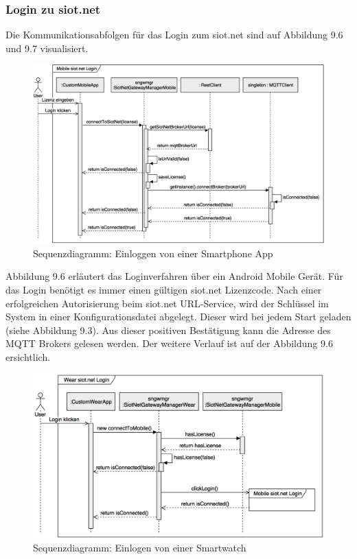 \subsubsection{Login zu siot.net}
Die Kommunikationsabfolgen für das Login zum siot.net sind auf Abbildung 9.6 und 9.7 visualisiert.
\begin{figure}[H]
  \centering
  \includegraphics[scale=0.28]{98_Bilder/09_Konzept/01_SequenzdiagrammLoginSiotNetGatewayLibrary}
  \caption[siot.net Gateway Library Sequenzdiagramm Login 1]{Sequenzdiagramm: Einloggen von einer Smartphone App}
\end{figure}
Abbildung 9.6 erläutert das Loginverfahren über ein Android Mobile Gerät. Für das Login benötigt es immer einen gültigen siot.net Lizenzcode. Nach einer erfolgreichen Autorisierung beim siot.net \gls{URL}-Service, wird der Schlüssel im System in einer Konfigurationsdatei abgelegt. Dieser wird bei jedem Start geladen (siehe Abbildung 9.3). Aus dieser positiven Bestätigung kann die Adresse des \gls{MQTT} Brokers gelesen werden. Der weitere Verlauf ist auf der Abbildung 9.6 ersichtlich.
\begin{figure}[H]
  \centering
  \includegraphics[scale=0.28]{98_Bilder/09_Konzept/02_SequenzdiagrammLoginSiotNetGatewayLibrary}
  \caption[siot.net Gateway Library Sequenzdiagramm Login 2]{Sequenzdiagramm: Einlogen von einer Smartwatch}
\end{figure}
